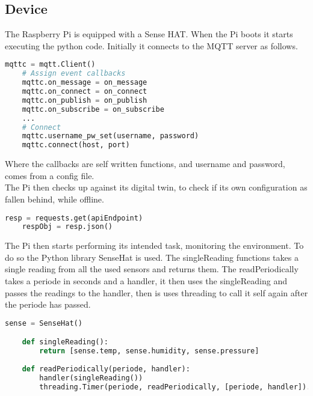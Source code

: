 \subsection{Device}
The Raspberry Pi is equipped with a Sense HAT. When the Pi boots it starts executing the python code. Initially it connects to the MQTT server as follows.
\begin{lstlisting}[language=Python, caption=Python MQTT setup, label={lst:rpmqtt}, basicstyle=\scriptsize]
    mqttc = mqtt.Client()
    # Assign event callbacks
    mqttc.on_message = on_message
    mqttc.on_connect = on_connect
    mqttc.on_publish = on_publish
    mqttc.on_subscribe = on_subscribe
    ...
    # Connect
    mqttc.username_pw_set(username, password)
    mqttc.connect(host, port) 
\end{lstlisting}
Where the callbacks are self written functions, and username and password, comes from a config file.\\
The Pi then checks up against its digital twin, to check if its own configuration as fallen behind, while offline.
\begin{lstlisting}[language=Python, caption=Python fetch digital twin config, label={lst:rpdtc}, basicstyle=\scriptsize]
    resp = requests.get(apiEndpoint)
    respObj = resp.json()
\end{lstlisting}
The Pi then starts performing its intended task, monitoring the environment. To do so the Python library SenseHat is used. The singleReading functions takes a single reading from all the used sensors and returns them. The readPeriodically takes a periode in seconds and a handler, it then uses the singleReading and passes the readings to the handler, then is uses threading to call it self again after the periode has passed.
\begin{lstlisting}[language=Python, caption=Python reading from sensehat, label={lst:rprfsh}, basicstyle=\scriptsize]
    sense = SenseHat()

    def singleReading():
        return [sense.temp, sense.humidity, sense.pressure]
    
    def readPeriodically(periode, handler): 
        handler(singleReading())
        threading.Timer(periode, readPeriodically, [periode, handler]).start()
\end{lstlisting}
